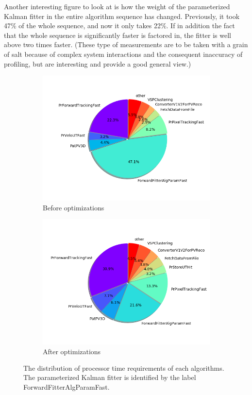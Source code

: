 \documentclass[12pt]{article}
\begin{document}
Another interesting figure to look at is how the weight of the parameterized Kalman fitter in the entire algorithm sequence has changed. Previously, it took 47\% of the whole sequence, and now it only takes 22\%. If in addition the fact that the whole sequence is significantly faster is factored in, the fitter is well above two times faster. \small (These type of measurements are to be taken with a grain of salt because of complex system interactions and the consequent inaccuracy of profiling, but are interesting and provide a good general view.) \normalsize

\begin{figure}[H]
	\centering
	\begin{subfigure}{.5\textwidth}
		\centering
		\includegraphics[width=\linewidth]{algo_usage_original_bestphys}
		\caption{Before optimizations}
	\end{subfigure}%
	\begin{subfigure}{.5\textwidth}
		\centering
		\includegraphics[width=\linewidth]{algo_usage_optkalman_bestphys}
		\caption{After optimizations}
	\end{subfigure}
	\caption[CPU time share of algorithms after Kalman fitter optimizations]{The distribution of processor time requirements of each algorithms. The parameterized Kalman fitter is identified by the label ForwardFitterAlgParamFast.}
	\label{fig_kalmanfit_results_algousage}
\end{figure}
\end{document}
